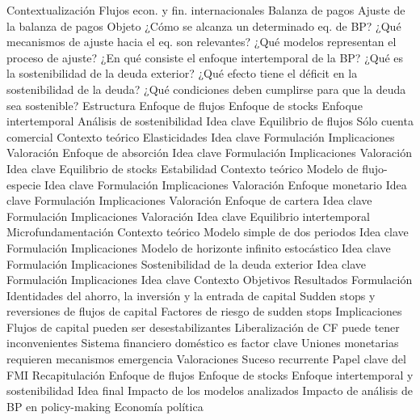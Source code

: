 \documentclass{nuevotema}
\begin{document}
\begin{esquema}[enumerate]
	\1[] 
		\2 Contextualización
			\3 Flujos econ. y fin. internacionales
			\3 Balanza de pagos
			\3 Ajuste de la balanza de pagos
		\2 Objeto
			\3 ¿Cómo se alcanza un determinado eq. de BP?
			\3 ¿Qué mecanismos de ajuste hacia el eq. son relevantes?
			\3 ¿Qué modelos representan el proceso de ajuste?
			\3 ¿En qué consiste el enfoque intertemporal de la BP?
			\3 ¿Qué es la sostenibilidad de la deuda exterior?
			\3 ¿Qué efecto tiene el déficit en la sostenibilidad de la deuda?
			\3 ¿Qué condiciones deben cumplirse para que la deuda sea sostenible?
		\2 Estructura
			\3 Enfoque de flujos
			\3 Enfoque de stocks
			\3 Enfoque intertemporal
			\3 Análisis de sostenibilidad
	\1 
		\2 Idea clave
			\3 Equilibrio de flujos
			\3 Sólo cuenta comercial
			\3 Contexto teórico
		\2 Elasticidades
			\3 Idea clave
			\3 Formulación
			\3 Implicaciones
			\3 Valoración
		\2 Enfoque de absorción
			\3 Idea clave
			\3 Formulación
			\3 Implicaciones
			\3 Valoración
	\1 
		\2 Idea clave
			\3 Equilibrio de stocks
			\3 Estabilidad
			\3 Contexto teórico
		\2 Modelo de flujo-especie
			\3 Idea clave
			\3 Formulación
			\3 Implicaciones
			\3 Valoración
		\2 Enfoque monetario
			\3 Idea clave
			\3 Formulación
			\3 Implicaciones
			\3 Valoración
		\2 Enfoque de cartera
			\3 Idea clave
			\3 Formulación
			\3 Implicaciones
			\3 Valoración
	\1 
		\2 Idea clave
			\3 Equilibrio intertemporal
			\3 Microfundamentación
			\3 Contexto teórico
		\2 Modelo simple de dos periodos
			\3 Idea clave
			\3 Formulación
			\3 Implicaciones
		\2 Modelo de horizonte infinito estocástico
			\3 Idea clave
			\3 Formulación
			\3 Implicaciones
		\2 Sostenibilidad de la deuda exterior
			\3 Idea clave
			\3 Formulación
			\3 Implicaciones
	\1 
		\2 Idea clave
			\3 Contexto
			\3 Objetivos
			\3 Resultados
		\2 Formulación
			\3 Identidades del ahorro, la inversión y la entrada de capital
			\3 Sudden stops y reversiones de flujos de capital
			\3 Factores de riesgo de sudden stops
		\2 Implicaciones
			\3 Flujos de capital pueden ser desestabilizantes
			\3 Liberalización de CF puede tener inconvenientes
			\3 Sistema financiero doméstico es factor clave
			\3 Uniones monetarias requieren mecanismos emergencia
		\2 Valoraciones
			\3 Suceso recurrente
			\3 Papel clave del FMI
	\1[] 
		\2 Recapitulación
			\3 Enfoque de flujos
			\3 Enfoque de stocks
			\3 Enfoque intertemporal y sostenibilidad
		\2 Idea final
			\3 Impacto de los modelos analizados
			\3 Impacto de análisis de BP en policy-making
			\3 Economía política

\end{esquema}
\end{document}
